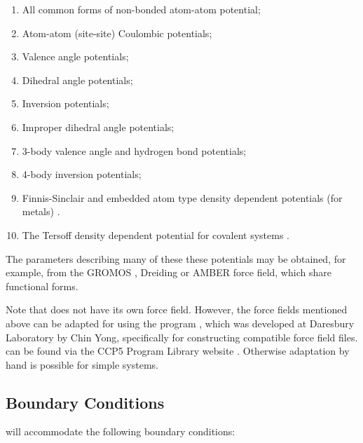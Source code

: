 \begin{enumerate}
\item All common forms of non-bonded atom-atom potential;
\item Atom-atom (site-site) Coulombic potentials;
\item Valence angle potentials;
\item Dihedral angle potentials;
\item Inversion potentials;
\item Improper dihedral angle potentials;
\item 3-body valence angle and hydrogen bond potentials;
\item 4-body inversion potentials;
\item Finnis-Sinclair and embedded atom type density dependent potentials (for metals) \cite{finnis-84a,johnson-89a}.
\item The Tersoff density dependent potential for covalent systems \cite{tersoff-89a}.
\end{enumerate}

The parameters describing many of these these potentials may be
obtained, for example, from the GROMOS \cite{gunsteren-87a},
Dreiding \cite{mayo-90a} or
AMBER \cite{weiner-86a}
force field, which share functional forms.

Note that \D{} does not have its own  force
field. However, the force fields mentioned above can be adapted for
\D{} using the program \DLF{}, which was developed at Daresbury
Laboratory by Chin Yong, specifically for constructing \DD{}
compatible force field files. \DLF{} can be found via the CCP5 Program
Library website \SOFT{}. Otherwise adaptation by hand is possible for
simple systems.

\subsection{Boundary Conditions}

\D{} will accommodate the following boundary conditions:

